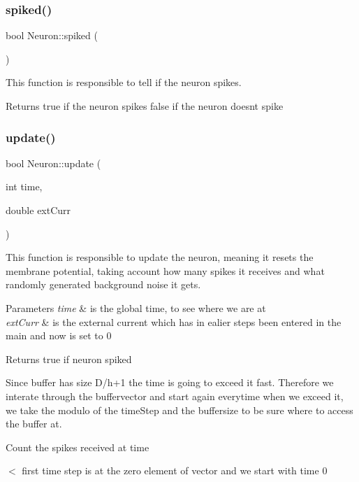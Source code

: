 \subsubsection{spiked()}
{\footnotesize\ttfamily bool Neuron\+::spiked (\begin{DoxyParamCaption}{ }\end{DoxyParamCaption})}

This function is responsible to tell if the neuron spikes.

\begin{DoxyReturn}{Returns}
true if the neuron spikes false if the neuron doesn\textquotesingle{}t spike 
\end{DoxyReturn}
\mbox{\label{class_neuron_a0e559ebeedcccc021e976d38d3fca3fa}} 
\subsubsection{update()}
{\footnotesize\ttfamily bool Neuron\+::update (\begin{DoxyParamCaption}\item[{int}]{time,  }\item[{double}]{ext\+Curr }\end{DoxyParamCaption})}

This function is responsible to update the neuron, meaning it resets the membrane potential, taking account how many spikes it receives and what randomly generated background noise it gets. 
\begin{DoxyParams}{Parameters}
{\em time} & is the global time, to see where we are at \\
\hline
{\em ext\+Curr} & is the external current which has in ealier steps been entered in the main and now is set to 0 \\
\hline
\end{DoxyParams}
\begin{DoxyReturn}{Returns}
true if neuron spiked 
\end{DoxyReturn}
Since buffer has size D/h+1 the time is going to exceed it fast. Therefore we interate through the buffervector and start again everytime when we exceed it, we take the modulo of the time\+Step and the buffersize to be sure where to access the buffer at.

Count the spikes received at time

$<$ first time step is at the zero element of vector and we start with time 0

